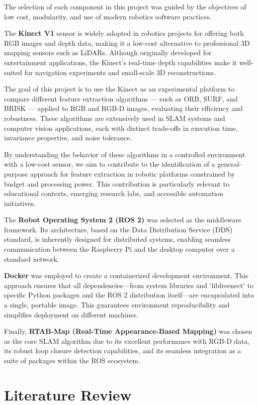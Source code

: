 \documentclass[a4paper,12pt]{article}
\begin{document}
The selection of each component in this project was guided by the objectives of low cost, modularity, and use of modern robotics software practices.

The \textbf{Kinect V1} sensor is widely adopted in robotics projects for offering both RGB images and depth data, making it a low-cost alternative to professional 3D mapping sensors such as LiDARs. Although originally developed for entertainment applications, the Kinect’s real-time depth capabilities make it well-suited for navigation experiments and small-scale 3D reconstructions.

The goal of this project is to use the Kinect as an experimental platform to compare different feature extraction algorithms — such as ORB, SURF, and BRISK — applied to RGB and RGB-D images, evaluating their efficiency and robustness. These algorithms are extensively used in SLAM systems and computer vision applications, each with distinct trade-offs in execution time, invariance properties, and noise tolerance.

By understanding the behavior of these algorithms in a controlled environment with a low-cost sensor, we aim to contribute to the identification of a general-purpose approach for feature extraction in robotic platforms constrained by budget and processing power. This contribution is particularly relevant to educational contexts, emerging research labs, and accessible automation initiatives.

The \textbf{Robot Operating System 2 (ROS 2)} was selected as the middleware framework. Its architecture, based on the Data Distribution Service (DDS) standard, is inherently designed for distributed systems, enabling seamless communication between the Raspberry Pi and the desktop computer over a standard network.

\textbf{Docker} was employed to create a containerized development environment. This approach ensures that all dependencies—from system libraries and `libfreenect` to specific Python packages and the ROS 2 distribution itself—are encapsulated into a single, portable image. This guarantees environment reproducibility and simplifies deployment on different machines.

Finally, \textbf{RTAB-Map (Real-Time Appearance-Based Mapping)} was chosen as the core SLAM algorithm due to its excellent performance with RGB-D data, its robust loop closure detection capabilities, and its seamless integration as a suite of packages within the ROS ecosystem.

\section{Literature Review}
\end{document}
